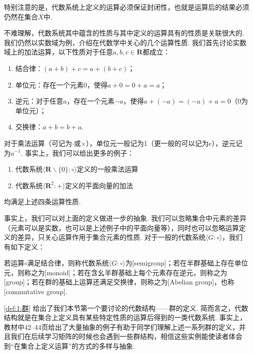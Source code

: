 特别注意的是，代数系统上定义的运算必须保证封闭性，也就是运算后的结果必须仍然在集合$X$中.

不难理解，代数系统其中蕴含的性质与其中定义的运算具有的性质是关联很大的. 我们仍然以实数域为例，介绍在代数学中关心的几个运算性质. 我们首先讨论实数域上的加法运算，以下性质对于任意$a,b,c\in\mathbf{R}$都成立：

\begin{enumerate}
    \item 结合律：$(a+b)+c=a+(b+c)$；

    \item 单位元：存在一个元素0，使得$a+0=0+a=a$；

    \item 逆元：对于任意$a$，存在一个元素$-a$，使得$a+(-a)=(-a)+a=0$（0为单位元）；

    \item 交换律：$a+b=b+a$.
\end{enumerate}

对于乘法运算（可记为$\cdot$或$\times$），单位元一般记为1（更一般的可以记为$e$），逆元记为$a^{-1}$. 事实上，我们可以给出更多的例子：
\begin{example}\label{ex:1:Abel 群}
    \begin{enumerate}
        \item 代数系统$\langle \mathbf{R}\backslash\{0\}:\circ\rangle$定义的一般乘法运算

        \item 代数系统$\langle \mathbf{R}^2:+\rangle$定义的平面向量的加法
    \end{enumerate}
    均满足上述四条运算性质.
\end{example}

事实上，我们可以对上面的定义做进一步的抽象. 我们可以忽略集合中元素的差异（元素可以是实数，也可以是上述例子中的平面向量等），同时也可以忽略运算定义的差异，只关心运算作用于集合元素的性质. 对于一般的代数系统$\langle G:\circ\rangle$，我们有如下定义：
\begin{definition}[群] \label{def:1:群}
    若运算$\circ$满足结合律，则称代数系统$\langle G:\circ\rangle$为[semigroup]；若在半群基础上存在单位元，则称之为[monoid]；若在含幺半群基础上每个元素存在逆元，则称之为[group]；若在群的基础上运算还满足交换律，则称之为[Abelian group]，也称[commutative group].
\end{definition}

\autoref{def:1:群} 给出了我们本节第一个要讨论的代数结构——群的定义. 简而言之，代数结构就是在集合上定义具有某些特定性质的运算后得到的一类代数系统. 事实上，教材中42--44页给出了大量抽象的例子有助于同学们理解上述一系列群的定义，并且我们在后续学习矩阵的时候也会遇到一些群结构，相信这些实例能使读者体会到``在集合上定义运算''的方式的多样与抽象.

